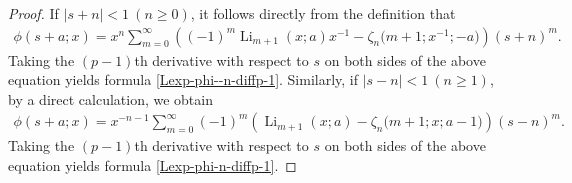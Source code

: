 \documentclass[10pt,a4paper]{amsart}
\DeclareMathOperator{\Li}{Li}
\begin{document}
\begin{proof}
If $|s+n|<1\ (n\geq 0)$, it follows directly from the definition that
\begin{align*}
\phi(s+a;x)=x^n \sum_{m=0}^\infty \left((-1)^m \Li_{m+1}(x;a)x^{-1}-\zeta_n\Big(m+1;x^{-1};-a\Big) \right)(s+n)^m.
\end{align*}
Taking the $(p-1)$th derivative with respect to $s$ on both sides of the above equation yields formula \eqref{Lexp-phi--n-diffp-1}. Similarly, if $|s-n|<1\ (n\geq 1)$, by a direct calculation, we obtain
\begin{align*}
\phi(s+a;x)=x^{-n-1} \sum_{m=0}^\infty (-1)^m \left( \Li_{m+1}(x;a)-\zeta_n\Big(m+1;x;a-1\Big) \right)(s-n)^m.
\end{align*}
Taking the $(p-1)$th derivative with respect to $s$ on both sides of the above equation yields formula \eqref{Lexp-phi-n-diffp-1}.
\end{proof}
\end{document}
